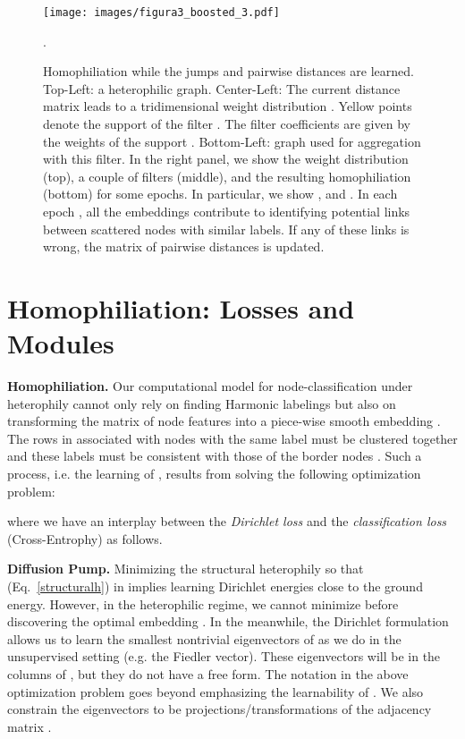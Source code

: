 \documentclass{article}
\theoremstyle{plain}
\theoremstyle{definition}
\begin{document}
\begin{figure*}[ht]
\begin{center}
\centerline{\texttt{[image: images/figura3\_boosted\_3.pdf]}}
    \caption{Homophiliation while the jumps and pairwise distances are learned. Top-Left: a heterophilic graph. Center-Left: The current distance matrix  leads to a tridimensional weight distribution . Yellow points denote the support  of the filter . The filter coefficients are given by the weights of the support . Bottom-Left: graph used for aggregation with this filter. In the right panel, we show the weight distribution (top), a couple of filters (middle), and the resulting homophiliation (bottom) for some epochs. In particular, we show ,  and . In each epoch , all the embeddings  contribute to identifying potential links between scattered nodes with similar labels. If any of these links is wrong, the matrix of pairwise distances  is updated.}.
    \label{fig:jump-explain}
\label{figure-pump}
\end{center}
\end{figure*} 
   
\section{Homophiliation: Losses and Modules}\label{sec:3}

\textbf{Homophiliation.} Our computational model for node-classification under heterophily cannot only rely on finding Harmonic labelings but also on transforming the matrix of node features  into a piece-wise smooth embedding . The rows in  associated with nodes with the same label must be clustered together and these labels must be consistent with those of the border nodes . Such a process, i.e. the learning of , results from solving the following optimization problem:

where we have an interplay between the \emph{Dirichlet loss}  and the \emph{classification loss} (Cross-Entrophy)  as follows. 

\textbf{Diffusion Pump.} Minimizing the structural heterophily so that  (Eq.~\ref{structuralh}) in  implies learning Dirichlet energies close to the ground energy. However, in the heterophilic regime, we cannot minimize  before discovering the optimal embedding . In the meanwhile, the Dirichlet formulation allows us to learn the smallest nontrivial eigenvectors of  as we do in the unsupervised setting (e.g. the Fiedler vector). These eigenvectors will be in the columns of , but they do not have a free form. The notation  in the above optimization problem goes beyond emphasizing the learnability of . We also constrain the eigenvectors to be projections/transformations of the adjacency matrix . 
\end{document}
